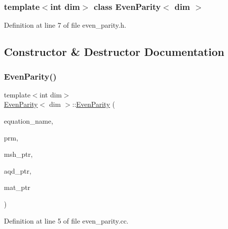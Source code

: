 \subsubsection*{template$<$int dim$>$\newline
class Even\+Parity$<$ dim $>$}



Definition at line 7 of file even\+\_\+parity.\+h.



\subsection{Constructor \& Destructor Documentation}
\mbox{\label{class_even_parity_a2877e7e239900be85cc84471fe670abd}} 
\subsubsection{\texorpdfstring{Even\+Parity()}{EvenParity()}}
{\footnotesize\ttfamily template$<$int dim$>$ \\
\hyperlink{class_even_parity}{Even\+Parity}$<$ dim $>$\+::\hyperlink{class_even_parity}{Even\+Parity} (\begin{DoxyParamCaption}\item[{std\+::string}]{equation\+\_\+name,  }\item[{const Parameter\+Handler \&}]{prm,  }\item[{const std\+\_\+cxx11\+::shared\+\_\+ptr$<$ \hyperlink{class_mesh_generator}{Mesh\+Generator}$<$ dim $>$ $>$}]{msh\+\_\+ptr,  }\item[{const std\+\_\+cxx11\+::shared\+\_\+ptr$<$ \hyperlink{class_a_q_base}{A\+Q\+Base}$<$ dim $>$ $>$}]{aqd\+\_\+ptr,  }\item[{const std\+\_\+cxx11\+::shared\+\_\+ptr$<$ \hyperlink{class_material_properties}{Material\+Properties} $>$}]{mat\+\_\+ptr }\end{DoxyParamCaption})}



Definition at line 5 of file even\+\_\+parity.\+cc.

\mbox{\label{class_even_parity_a9c3caf641043e0a1e44632478946576b}} 
